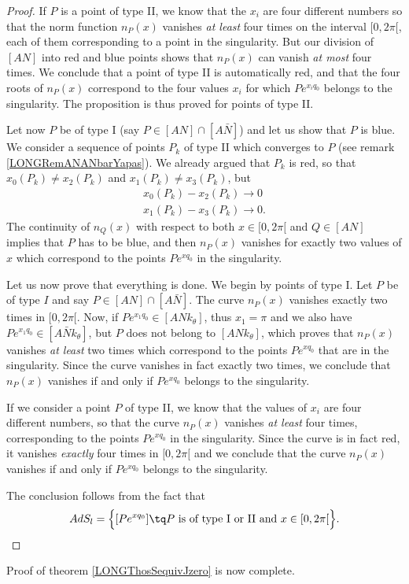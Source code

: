 \begin{proof}
If $P$ is a point of type II, we know that the $x_i$ are four different numbers so that the norm function $n_P(x)$ vanishes \emph{at least} four times on the interval $\mathopen[ 0 , 2\pi [$, each of them corresponding to a point in the singularity. But our division of $[AN]$ into red and blue points shows that $n_P(x)$ can vanish \emph{at most} four times. We conclude that a point of type II is automatically red, and that the four roots of $n_P(x)$ correspond to the four values $x_i$ for which $P e^{x_iq_0}$ belongs to the singularity. The proposition is thus proved for points of type II.

Let now $P$ be of type I (say $P\in [AN]\cap [A\bar N]$) and let us show that $P$ is blue. We consider a sequence of points $P_k$ of type II which converges to $P$ (see remark \ref{LONGRemANANbarYapas}). We already argued that $P_k$ is red, so that $x_0(P_k)\neq x_2(P_k)$ and $x_1(P_k)\neq x_3(P_k)$, but
\begin{subequations}
    \begin{align}
        x_0(P_k)-x_2(P_k)\to 0\\
        x_1(P_k)-x_3(P_k)\to 0.
    \end{align}
\end{subequations}
The continuity of $n_Q(x)$ with respect to both $x\in\mathopen[ 0 , 2\pi [$ and $Q\in[AN]$ implies that $P$ has to be blue, and then $n_P(x)$ vanishes for exactly two values of $x$ which correspond to the points $P e^{xq_0}$ in the singularity.

Let us now prove that everything is done. We begin by points of type I. Let $P$ be of type $I$ and say $P\in[AN]\cap[A\bar N]$. The curve $n_P(x)$ vanishes exactly two times in $\mathopen[ 0 , 2\pi [$. Now, if $P e^{x_1 q_0}\in[ANk_{\theta}]$, thus $x_1 = \pi$ and we also have $P e^{x_1q_0}\in[A\bar Nk_{\theta}]$, but $P$ does not belong to $[ANk_{\theta}]$, which proves that $n_P(x)$ vanishes \emph{at least} two times which correspond to the points $P e^{xq_0}$ that are in the singularity. Since the curve vanishes in fact exactly two times, we conclude that $n_P(x)$ vanishes if and only if $P e^{xq_0}$ belongs to the singularity.

If we consider a point $P$ of type II, we know that the values of $x_i$ are four different numbers, so that the curve $n_P(x)$ vanishes \emph{at least} four times, corresponding to the points $P e^{xq_0}$ in the singularity. Since the curve is in fact red, it vanishes \emph{exactly} four times in $\mathopen[ 0 , 2\pi [$ and we conclude that the curve $n_P(x)$ vanishes if and only if $P e^{xq_0}$ belongs to the singularity.

The conclusion follows from the fact that 
\begin{equation}
    AdS_l=\Big\{ [P e^{xq_0}] \tq P \text{ is of type I or II and  } x\in\mathopen[ 0 , 2\pi [ \Big\}.
\end{equation}
\end{proof}
Proof of theorem \ref{LONGThosSequivJzero} is now complete.


